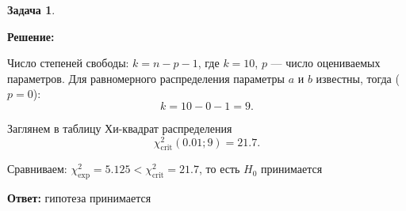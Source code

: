 \documentclass[a4paper,11pt]{article}
\newenvironment{shdd}{\begin{mdframed}[backgroundcolor=shadecolor]}{\end{mdframed}}
\theoremstyle{definition}
\newtheorem{problem}{Задача}\setlength{\parindent}{0pt}
\newenvironment{solution}
{\begin{shdd}
     \textbf{Решение:}\par\setlength{\parindent}{0pt}}
     {
\end{shdd}}
\newenvironment{answer}
{\par\noindent\textbf{Ответ:}}
{\par}
\begin{document}
\begin{problem}
\begin{solution}
            Число степеней свободы: \(k = n - p - 1\), где \(k = 10\), \(p\) — число оцениваемых параметров.
            Для равномерного распределения параметры \(a\) и \(b\) известны, тогда (\(p = 0\)):
            \[
                k = 10 - 0 - 1 = 9.
            \]

            Заглянем в таблицу Хи-квадрат распределения
            \[
                \chi^2_{\text{crit}}(0.01; 9) = 21.7.
            \]

            Сравниваем: \(\chi^2_{\text{exp}} = 5.125 < \chi^2_{\text{crit}} = 21.7\), то есть \(H_0\) принимается

        \end{solution}

        \begin{answer}
            гипотеза принимается
        \end{answer}

    \end{problem}
\end{document}
